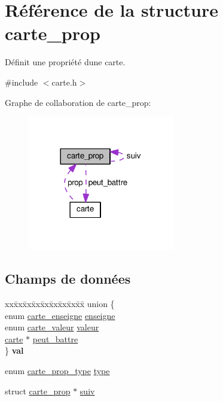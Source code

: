 \hypertarget{structcarte__prop}{}\section{Référence de la structure carte\+\_\+prop}
\label{structcarte__prop}


Définit une propriété d\textquotesingle{}une carte.  




{\ttfamily \#include $<$carte.\+h$>$}



Graphe de collaboration de carte\+\_\+prop\+:
\nopagebreak
\begin{figure}[H]
\begin{center}
\leavevmode
\includegraphics[width=182pt]{structcarte__prop__coll__graph}
\end{center}
\end{figure}
\subsection*{Champs de données}
\begin{DoxyCompactItemize}
\item 
\begin{tabbing}
xx\=xx\=xx\=xx\=xx\=xx\=xx\=xx\=xx\=\kill
union \{\\
\>enum \hyperlink{carte_8h_a2b6a5add5e3db9028dff54f9c1acdde7}{carte\_enseigne} \hyperlink{structcarte__prop_aa01631e22730e71acdae17bec74fcdd3}{enseigne}\\
\>enum \hyperlink{carte_8h_a323916cdb68cd0d5d8a1660ffb45ea4e}{carte\_valeur} \hyperlink{structcarte__prop_a8069caea55ffab4bbdbb27b9d2b1c651}{valeur}\\
\>\hyperlink{structcarte}{carte} $\ast$ \hyperlink{structcarte__prop_a23cb7c2805cd6c447786465937cb0255}{peut\_battre}\\
\} {\bfseries val}\hypertarget{structcarte__prop_a36e90757d299ff149c6884f54e18e84b}{}\label{structcarte__prop_a36e90757d299ff149c6884f54e18e84b}
\\

\end{tabbing}\item 
enum \hyperlink{carte_8h_a71a2818c25230a5e1a239f28c1e6deba}{carte\+\_\+prop\+\_\+type} \hyperlink{structcarte__prop_a434a5fe3ac234b8886126c4ea9acf243}{type}
\item 
struct \hyperlink{structcarte__prop}{carte\+\_\+prop} $\ast$ \hyperlink{structcarte__prop_a0cb42544111674aa11728c2b7392a661}{suiv}
\end{DoxyCompactItemize}


